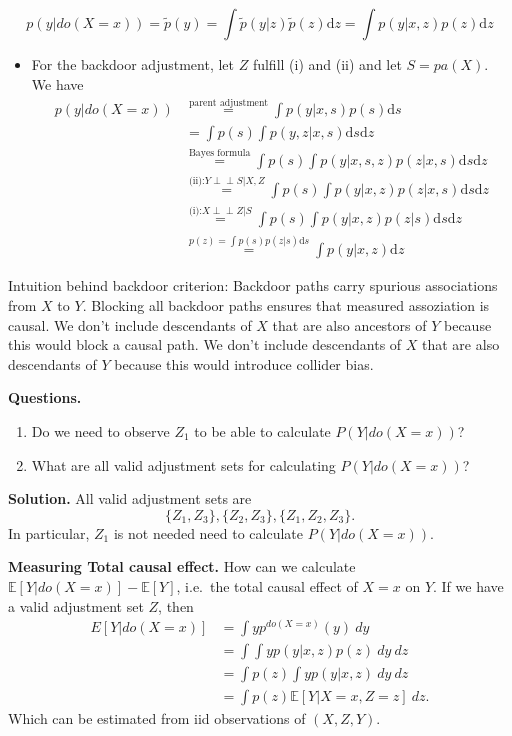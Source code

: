 \documentclass[a4paper,12pt,openany]{book}
\providecommand{\tightlist}{%
 \setlength{\itemsep}{0pt}\setlength{\parskip}{0pt}}
\begin{document}
\[
p(y|do(X=x))= \tilde p(y)= \int \tilde p(y|z) \tilde p(z) \mathrm dz = \int  p(y|x,z)  p(z) \mathrm dz
\]

\begin{itemize}
\tightlist
\item
  For the backdoor adjustment, let \(Z\) fulfill (i) and (ii) and let \(S=pa(X)\). We have
  \begin{align}
  p(y|do(X=x))&\stackrel{\text{parent adjustment}}{=} \int  p(y|x,s)  p(s) \mathrm ds\\
  &=\int p(s)\int   p(y,z|x,s) \mathrm ds \mathrm dz \\
  &\stackrel{\text{Bayes formula}}{=}\int p(s)\int   p(y|x,s,z) p(z|x,s) \mathrm ds \mathrm dz \\
  &\stackrel{\text{(ii):} Y {\perp\!\!\!\!\perp } {S}| {X,Z}}{=}\int p(s)\int   p(y|x,z) p(z|x,s) \mathrm ds \mathrm dz \\
  &\stackrel{\text{(i):} X {\perp\!\!\!\!\perp } {Z}| {S}}{=}\int p(s)\int   p(y|x,z) p(z|s) \mathrm ds \mathrm dz \\
  &\stackrel{p(z)= \int p(s)p(z|s) \mathrm ds}{=}\int   p(y|x,z)   \mathrm dz 
  \end{align}
\end{itemize}

Intuition behind backdoor criterion: Backdoor paths carry spurious associations from \(X\) to \(Y\). Blocking all backdoor paths ensures that measured assoziation is causal. We don't include descendants of \(𝑋\) that are also ancestors of \(𝑌\) because this would block a causal path. We don't include descendants of \(𝑋\) that are also descendants of \(𝑌\) because this would introduce collider bias.

\textbf{Questions.}

\begin{enumerate}
\def\labelenumi{\alph{enumi}.}
\tightlist
\item
  Do we need to observe \(Z_1\) to be able to calculate \(P(Y|do(X=x))\)?
\item
  What are all valid adjustment sets for calculating \(P(Y|do(X=x))\)?
\end{enumerate}

\textbf{Solution.} All valid adjustment sets are
\[
\{Z_1,Z_3\},\{Z_2,Z_3\},\{Z_1,Z_2,Z_3\}.
\]
In particular, \(Z_1\) is not needed need to calculate \(P(Y\vert do(X=x))\).

\textbf{Measuring Total causal effect.} How can we calculate \(\mathbb E[Y\vert do(X =x)]-\mathbb E[Y]\), i.e.~the total causal effect of \(X=x\) on \(Y\). If we have a valid adjustment set \(Z\), then
\begin{align}
E[Y\vert do(X =x)]&= \int y p^{d o(X=x)}(y) \ dy \\
&= \int \int  y p(y\vert x,z)p(z) \ dy \ dz \\
&= \int p(z)   \int y p(y\vert x,z)\ dy \ dz \\
&= \int p(z)  \mathbb E[  Y\vert X=x,Z=z]\ dz .
\end{align}
Which can be estimated from iid observations of \((X,Z,Y)\).
\end{document}
